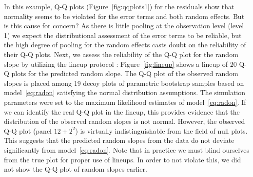 \documentclass[12pt]{article} %
\begin{document}
In this example, Q-Q plots (Figure~\ref{fig:qqplots1}) for the residuals show that normality 
seems to be violated for the error terms and both random effects. But is this cause for concern?
As there is little pooling at the observation level (level 1) we expect the distributional assessment of the error terms to be reliable, but  the high degree of pooling  for the random effects  casts doubt on the reliability of their Q-Q plots. Next, we assess the reliability of the Q-Q plot for the random slope by utilizing the lineup protocol \citep{buja:2009}:
Figure~\ref{fig:lineup} shows a lineup \citep{buja:2009} of 20 Q-Q plots for the predicted random slope. The Q-Q plot of the observed random slopes is placed among 19 decoy plots of parametric bootstrap samples based on model~\eqref{eq:radon} satisfying the normal distribution assumptions. The simulation parameters were set to the maximum likelihood estimates of model~\eqref{eq:radon}. 
If we can identify the real Q-Q plot in the lineup, this provides evidence that the distribution of the observed random slopes is not normal. However, 
the observed Q-Q plot (panel $12+2^2$) is virtually indistinguishable from the field of null plots. This suggests that the predicted random slopes  from the data do not deviate significantly from model~\eqref{eq:radon}. 
Note that in practice we must blind ourselves from the true plot for proper use of lineups. In order to not violate this, we did not show the Q-Q plot of random slopes earlier.
%
%
\end{document}
